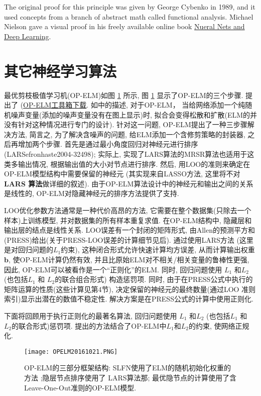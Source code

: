 The original proof for this principle was given by George Cybenko in 1989, and it used concepts from a branch of abstract math called functional analysis. Michael Nielson gave a visual proof in his freely available online book \href{http://neuralnetworksanddeeplearning.com/chap4.html}{Nueral Nets and Deep Learning}.
\section{其它神经学习算法}
最优剪枝极值学习机(OP-ELM)如图 \ref{OPELM20161021fig2} 所示, 图 \ref{OPELM20161021fig2} 显示了OP-ELM的三个步骤.
提出了 (\href{http://www.cis.hut.fi/projects/eiml/research/download}{OP-ELM工具箱下载}.
如\cite{Miche2008OP, Miche2008A, Miche2010OP}中的描述, 对于OP-ELM， 当给网络添加一个纯随机噪声变量(添加的噪声变量没有在图上显示)时, 拟合会变得松散和扩散(ELM的并没有针对这种情况进行专门的设计).
针对这一问题, OP-ELM提出了一种三步骤解决方法, 简言之, 为了解决含噪声的问题, 给ELM添加一个含修剪策略的封装器, 之后再增加两个步骤.
首先是通过最小角度回归对神经元进行排序(LARS{efronhaste2004-32498});
实际上, 实现了LARS算法的MRSR算法\cite{SimiläTikka2005-32497}也适用于这类多输出情况, 根据输出值的大小对节点进行排序.
然后, 用LOO的准则来确定在OP-ELM模型结构中需要保留的神经元 (其实现来自LASSO方法, 这里将不对\textbf{LARS 算法}做详细的叙述).
由于OP-ELM算法设计中的神经元和输出之间的关系是线性的, OP-ELM对隐藏神经元的排序方法提供了支持.

LOO优化参数方法通常是一种代价高昂的方法, 它需要在整个数据集(只除去一个样本)上训练模型, 并对数据集的所有样本重复求值.
在OP-ELM结构中, 隐藏层和输出层的结点是线性关系. LOO误差有一个封闭的矩阵形式, 由Allen的预测平方和(PRESS)给出(关于PRESS-LOO误差的计算细节见后).
通过使用LARS方法 (这里是对回归问题的$L_1$约束), 这种闭合形式允许快速计算均方误差, 从而计算输出权重$\bm b$, 使OP-ELM计算仍然有效, 并且比原始ELM对不相关/相关变量的鲁棒性更强, 因此, OP-ELM可以被看作是一个“正则化”的ELM.
同时, 回归问题使用 $L_1$ 和$L_2$ (也包括$L_1$ 和 $L_2$的联合组合形式) 构造惩罚项.
同时, 由于在PRESS公式中执行的矩阵运算的性质(这些计算见第4节), 决定保留的神经元的最终数量(通过LOO 准则索引)显示出潜在的数值不稳定性.
解决方案是在PRESS公式的计算中使用正则化.

下面将回顾用于执行正则化的最著名算法, 回归问题使用 $L_1$ 和$L_2$ (也包括$L_1$ 和 $L_2$的联合形式)惩罚项.
提出的方法结合了OP-ELM中$L_1$和$L_2$的约束, 使网络正规化.
\begin{figure}[t]
    \begin{center}
    \texttt{[image: OPELM20161021.PNG]}
    \end{center}
    \caption{OP-ELM的三部分框架结构: SLFN使用了ELM的随机初始化权重的方法 ;隐层节点排序使用了 LARS算法那; 最优隐节点的计算使用了含Leave-One-Out准则的OP-ELM模型.}
    \label{OPELM20161021fig2}
\end{figure}
